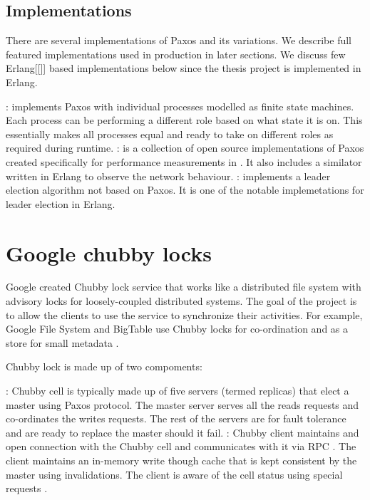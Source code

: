 \subsection{Implementations}

There are several implementations of Paxos and its variations. We describe full
featured implementations used in production in later sections. We discuss few
Erlang[[]] based implementations below since the thesis project is implemented
in Erlang.

\begin{itemize}
    : \citep{Uenishi2012} implements Paxos with
    individual processes modelled as finite state machines. Each process can
    be performing a different role based on what state it is on. This 
    essentially makes all processes equal and ready to take on different roles
    as required during runtime.
    : \citet{Lugano2012} is a collection of open source 
    implementations of Paxos created specifically for performance measurements
    in \citet{MarandiPSP10}. It also includes a similator written in Erlang to
    observe the network behaviour.
    : \citet{Ulf2012} implements a leader election algorithm
    not based on Paxos. It is one of the notable implemetations for leader
    election in Erlang.
\end{itemize}

\section{Google chubby locks}
\label{section:chubby.locks}

Google created Chubby lock service \citep{Burrows06} that works like a 
distributed file system with advisory locks for loosely-coupled distributed 
systems. The goal of the project is to allow the clients to use the service
to synchronize their activities. For example, Google File System \citep{gfs} 
and BigTable \citep{ChangDGHWBCFG06} use Chubby locks for co-ordination and
as a store for small metadata \citep{ChandraGR07}.

Chubby lock is made up of two compoments:

\begin{itemize}
    : Chubby cell is typically made up of five servers 
    (termed replicas) that elect a master using Paxos protocol. The master
    server serves all the reads requests and co-ordinates the writes requests.
    The rest of the servers are for fault tolerance and are ready to replace the
    master should it fail.
    : Chubby client maintains and open connection with
    the Chubby cell and communicates with it via RPC%
    . The client maintains an in-memory write though cache that
    is kept consistent by the master using invalidations. The client is
    aware of the cell status using special requests%
    .
\end{itemize}

